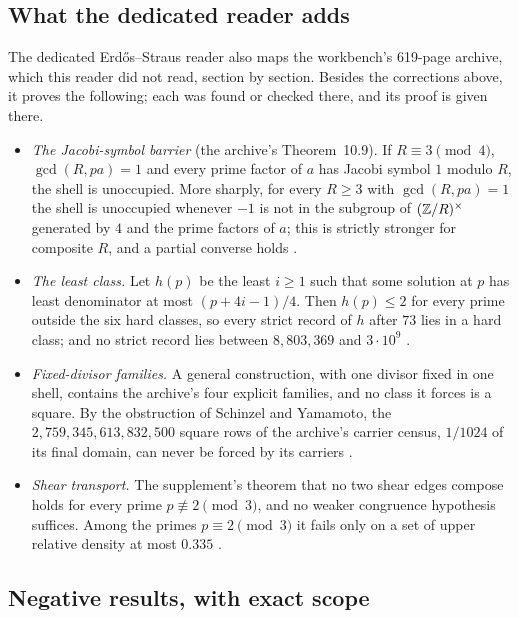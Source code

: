 \subsection{What the dedicated reader adds}

The dedicated Erdős--Straus reader \cite{ESReader} also maps the workbench's 619-page archive, which this reader did not read, section by section. Besides the corrections above, it proves the following; each was found or checked there, and its proof is given there.
\begin{itemize}
\item \emph{The Jacobi-symbol barrier} (the archive's Theorem~10.9). If $R\equiv3\pmod4$, $\gcd(R,pa)=1$ and every prime factor of $a$ has Jacobi symbol $1$ modulo $R$, the shell is unoccupied. More sharply, for every $R\ge3$ with $\gcd(R,pa)=1$ the shell is unoccupied whenever $-1$ is not in the subgroup of $(\mathbb{Z}/R)^\times$ generated by $4$ and the prime factors of $a$; this is strictly stronger for composite $R$, and a partial converse holds \cite[Propositions~3.6--3.8]{ESReader}.
\item \emph{The least class.} Let $h(p)$ be the least $i\ge1$ such that some solution at $p$ has least denominator at most $(p+4i-1)/4$. Then $h(p)\le2$ for every prime outside the six hard classes, so every strict record of $h$ after $73$ lies in a hard class; and no strict record lies between $8{,}803{,}369$ and $3\cdot10^9$ \cite[Corollary~4.2, Proposition~4.3]{ESReader}.
\item \emph{Fixed-divisor families.} A general construction, with one divisor fixed in one shell, contains the archive's four explicit families, and no class it forces is a square. By the obstruction of Schinzel and Yamamoto, the $2{,}759{,}345{,}613{,}832{,}500$ square rows of the archive's carrier census, $1/1024$ of its final domain, can never be forced by its carriers \cite[Propositions~4.4 and~4.6, Corollary~4.7]{ESReader}.
\item \emph{Shear transport.} The supplement's theorem that no two shear edges compose holds for every prime $p\not\equiv2\pmod3$, and no weaker congruence hypothesis suffices. Among the primes $p\equiv2\pmod3$ it fails only on a set of upper relative density at most $0.335$ \cite[Propositions~2.1 and~2.2, Remark~2.3]{ESReader}.
\end{itemize}

\subsection{Negative results, with exact scope}

